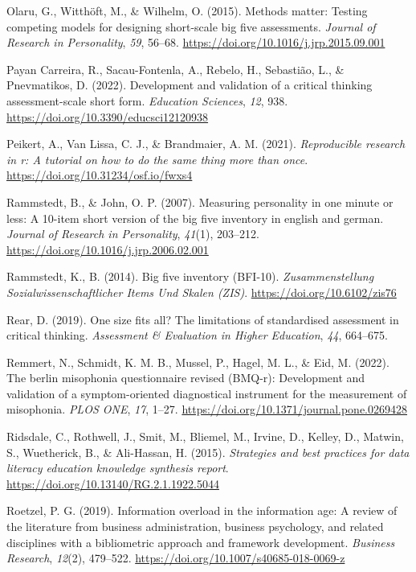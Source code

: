 \documentclass[
  12pt,
  a4paper,
  twoside]{article}
\newlength{\cslhangindent}
\newenvironment{CSLReferences}[2] %
 {\begin{list}{}{%
  \setlength{\itemindent}{0pt}
  \setlength{\leftmargin}{0pt}
  \setlength{\parsep}{0pt}
  \ifodd #1
   \setlength{\leftmargin}{\cslhangindent}
   \setlength{\itemindent}{-1\cslhangindent}
  \fi
  \setlength{\itemsep}{#2\baselineskip}}}
 {\end{list}}
\begin{document}
\begin{CSLReferences}{1}{0}
Olaru, G., Witthöft, M., \& Wilhelm, O. (2015). Methods matter: Testing competing models for designing short-scale big five assessments. \emph{Journal of Research in Personality}, \emph{59}, 56--68. \url{https://doi.org/10.1016/j.jrp.2015.09.001}

Payan Carreira, R., Sacau-Fontenla, A., Rebelo, H., Sebastião, L., \& Pnevmatikos, D. (2022). Development and validation of a critical thinking assessment-scale short form. \emph{Education Sciences}, \emph{12}, 938. \url{https://doi.org/10.3390/educsci12120938}

Peikert, A., Van Lissa, C. J., \& Brandmaier, A. M. (2021). \emph{Reproducible research in r: A tutorial on how to do the same thing more than once}. \url{https://doi.org/10.31234/osf.io/fwxs4}

Rammstedt, B., \& John, O. P. (2007). Measuring personality in one minute or less: A 10-item short version of the big five inventory in english and german. \emph{Journal of Research in Personality}, \emph{41}(1), 203--212. \url{https://doi.org/10.1016/j.jrp.2006.02.001}

Rammstedt, K., B. (2014). Big five inventory (BFI-10). \emph{Zusammenstellung Sozialwissenschaftlicher Items Und Skalen (ZIS)}. \url{https://doi.org/10.6102/zis76}

Rear, D. (2019). One size fits all? The limitations of standardised assessment in critical thinking. \emph{Assessment \& Evaluation in Higher Education}, \emph{44}, 664--675.

Remmert, N., Schmidt, K. M. B., Mussel, P., Hagel, M. L., \& Eid, M. (2022). The berlin misophonia questionnaire revised (BMQ-r): Development and validation of a symptom-oriented diagnostical instrument for the measurement of misophonia. \emph{PLOS ONE}, \emph{17}, 1--27. \url{https://doi.org/10.1371/journal.pone.0269428}

Ridsdale, C., Rothwell, J., Smit, M., Bliemel, M., Irvine, D., Kelley, D., Matwin, S., Wuetherick, B., \& Ali-Hassan, H. (2015). \emph{Strategies and best practices for data literacy education knowledge synthesis report}. \url{https://doi.org/10.13140/RG.2.1.1922.5044}

Roetzel, P. G. (2019). Information overload in the information age: A review of the literature from business administration, business psychology, and related disciplines with a bibliometric approach and framework development. \emph{Business Research}, \emph{12}(2), 479--522. \url{https://doi.org/10.1007/s40685-018-0069-z}


\end{CSLReferences}
\end{document}
